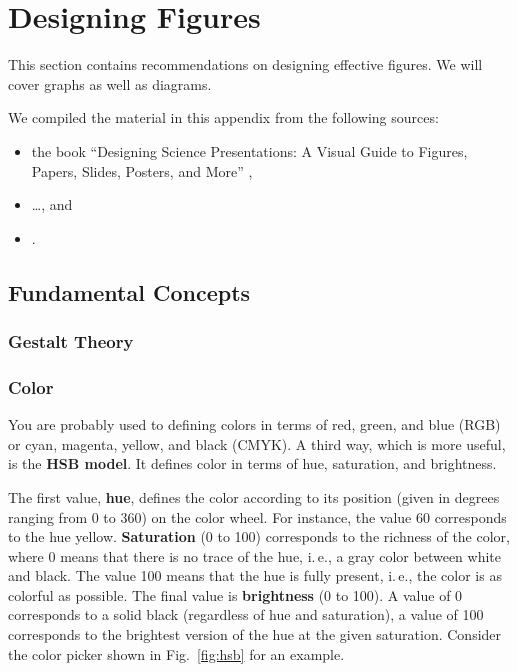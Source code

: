  
\chapter{Designing Figures}

This section contains recommendations on designing effective figures. We will cover graphs as well as diagrams.

We compiled the material in this appendix from the following sources:
\begin{itemize}
  \item the book ``Designing Science Presentations: A Visual Guide to Figures, Papers, Slides, Posters, and More'' \cite{Carter12},
  \item …, and 
  \item .
\end{itemize}

\section{Fundamental Concepts}

\subsection{Gestalt Theory}


% 

\subsection{Color}

You are probably used to defining colors in terms of red, green, and blue (RGB) or cyan, magenta, yellow, and black (CMYK). A third way, which is more useful, is the \textbf{HSB model}. It defines color in terms of hue, saturation, and brightness.

The first value, \textbf{hue}, defines the color according to its position (given in degrees ranging from 0 to 360) on the color wheel. For instance, the value 60 corresponds to the hue yellow. \textbf{Saturation} (0 to 100) corresponds to the richness of the color, where 0 means that there is no trace of the hue, i.\,e., a gray color between white and black. The value 100 means that the hue is fully present, i.\,e., the color is as colorful as possible. The final value is \textbf{brightness} (0 to 100). A value of 0 corresponds to a solid black (regardless of hue and saturation), a value of 100 corresponds to the brightest version of the hue at the given saturation. Consider the color picker shown in Fig.~\ref{fig:hsb} for an example.

